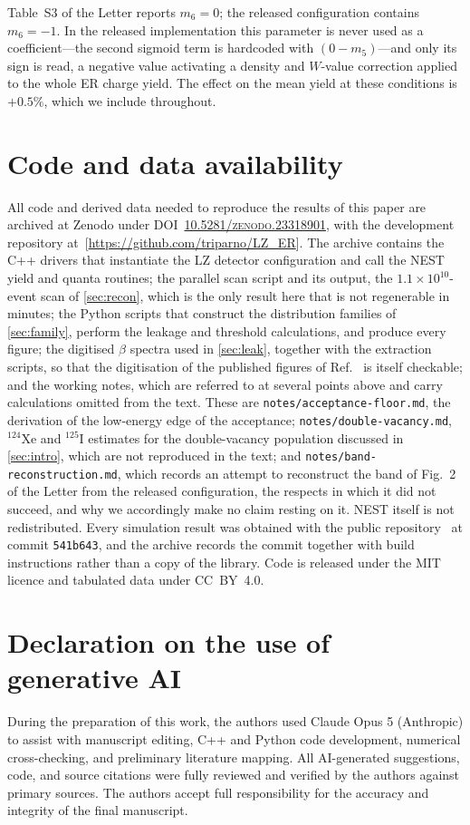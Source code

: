 \documentclass[11pt,a4paper]{article}
\begin{document}
Table~S3 of the Letter reports \(m_6=0\); the released configuration
contains \(m_6=-1\). In the released implementation this parameter is
never used as a coefficient---the second sigmoid term is hardcoded with
\((0-m_5)\)---and only its sign is read, a negative value activating a
density and \(W\)-value correction applied to the whole ER charge yield.
The effect on the mean yield at these conditions is \(+0.5\%\), which we
include throughout.

\section*{Code and data availability}

All code and derived data needed to reproduce the results of this paper
are archived at Zenodo under
DOI~\textsc{\href{https://zenodo.org/records/23318901}{10.5281/zenodo.23318901}},
with the development repository
at~[\url{https://github.com/triparno/LZ_ER}]. The archive contains the
C++ drivers that instantiate the LZ detector configuration and call the
NEST yield and quanta routines; the parallel scan script and its output,
the \(1.1\times10^{10}\)-event scan of \cref{sec:recon}, which is the
only result here that is not regenerable in minutes; the Python scripts
that construct the distribution families of \cref{sec:family}, perform
the leakage and threshold calculations, and produce every figure; the
digitised \(\beta\) spectra used in \cref{sec:leak}, together with the
extraction scripts, so that the digitisation of the published figures of
Ref.~\cite{BetaShapes} is itself checkable; and the working notes, which
are referred to at several points above and carry calculations omitted
from the text. These are \texttt{notes/acceptance-floor.md}, the
derivation of the low-energy edge of the acceptance;
\texttt{notes/double-vacancy.md}, \(^{124}\)Xe and \(^{125}\)I estimates
for the double-vacancy population discussed in \cref{sec:intro}, which
are not reproduced in the text; and
\texttt{notes/band-reconstruction.md}, which records an attempt to
reconstruct the band of Fig.~2 of the Letter from the released
configuration, the respects in which it did not succeed, and why we
accordingly make no claim resting on it. NEST itself is not
redistributed. Every simulation result was obtained with the public
repository~\cite{NESTcode} at commit \texttt{541b643}, and the archive
records the commit together with build instructions rather than a copy
of the library. Code is released under the MIT licence and tabulated
data under CC~BY~4.0.

\section*{Declaration on the use of generative AI}
During the preparation of this work, the authors used Claude Opus 5
(Anthropic) to assist with manuscript editing, C++ and Python code
development, numerical cross-checking, and preliminary literature
mapping. All AI-generated suggestions, code, and source citations were
fully reviewed and verified by the authors against primary sources. The
authors accept full responsibility for the accuracy and integrity of the
final manuscript.



\end{document}
